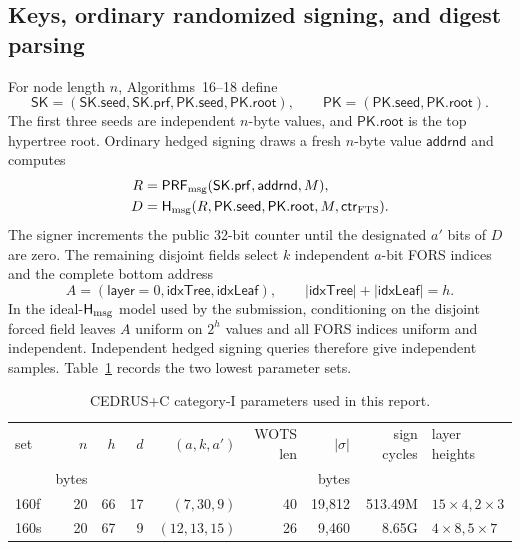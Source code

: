 \documentclass[11pt,a4paper]{article}
\newcommand{\PRFmsg}{\ensuremath{\mathsf{PRF}_{\rm msg}}}
\newcommand{\Hmsg}{\ensuremath{\mathsf{H}_{\rm msg}}}
\newcommand{\pk}{\ensuremath{\mathsf{PK}}}
\newcommand{\sk}{\ensuremath{\mathsf{SK}}}
\begin{document}
\subsection{Keys, ordinary randomized signing, and digest parsing}

For node length $n$, Algorithms~16--18 define
\begin{equation}
 \sk=(\sk.\mathsf{seed},\sk.\mathsf{prf},
      \pk.\mathsf{seed},\pk.\mathsf{root}),\qquad
 \pk=(\pk.\mathsf{seed},\pk.\mathsf{root}).           \label{eq:keys}
\end{equation}
The first three seeds are independent $n$-byte values, and
$\pk.\mathsf{root}$ is the top hypertree root.  Ordinary hedged signing draws
a fresh $n$-byte value $\mathsf{addrnd}$ and computes
\begin{align}
 R&=\PRFmsg(\sk.\mathsf{prf},\mathsf{addrnd},M),        \label{eq:R}\\
 D&=\Hmsg(R,\pk.\mathsf{seed},\pk.\mathsf{root},
           M,\mathsf{ctr}_{\rm FTS}).                  \label{eq:D}
\end{align}
The signer increments the public 32-bit counter until the designated $a'$ bits
of $D$ are zero.  The remaining disjoint fields select $k$ independent
$a$-bit FORS indices and the complete bottom address
\begin{equation}
 A=(\mathsf{layer}=0,\mathsf{idxTree},\mathsf{idxLeaf}),
 \qquad |\mathsf{idxTree}|+|\mathsf{idxLeaf}|=h .       \label{eq:address}
\end{equation}
In the ideal-$\Hmsg$ model used by the submission, conditioning on the
disjoint forced field leaves $A$ uniform on $2^h$ values and all FORS indices
uniform and independent.  Independent hedged signing queries therefore give
independent samples.  Table~\ref{tab:params} records the two lowest parameter
sets.

\begin{table}[ht]
\centering
\caption{CEDRUS+C category-I parameters used in this report.}
\label{tab:params}
\begin{tabular}{lrrrrrrrl}
\toprule
set & $n$ & $h$ & $d$ & $(a,k,a')$ & WOTS len & $|\sigma|$ & sign cycles & layer heights\\
 & bytes &&&&& bytes &&\\
\midrule
160f &20&66&17&$(7,30,9)$ &40&19,812&513.49M &$15\times4,2\times3$\\
160s &20&67& 9&$(12,13,15)$&26& 9,460&8.65G &$4\times8,5\times7$\\
\bottomrule
\end{tabular}
\end{table}
\end{document}

